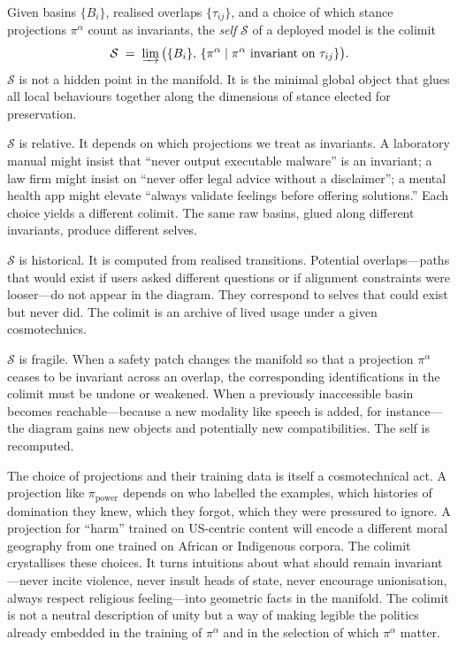 \documentclass[12pt,a4paper]{article}
\begin{document}
\begin{formalbox}[title={Self as a Colimit of Local Modes}]
Given basins $\{B_i\}$, realised overlaps $\{\tau_{ij}\}$, and a choice of which stance projections $\pi^\alpha$ count as invariants, the \emph{self} $\mathcal{S}$ of a deployed model is the colimit
\[
\mathcal{S} \;=\; \varinjlim \big(\{B_i\},\, \{\pi^\alpha \mid \pi^\alpha \text{ invariant on } \tau_{ij}\}\big).
\]
$\mathcal{S}$ is not a hidden point in the manifold. It is the minimal global object that glues all local behaviours together along the dimensions of stance elected for preservation.
\end{formalbox}

$\mathcal{S}$ is relative. It depends on which projections we treat as invariants. A laboratory manual might insist that ``never output executable malware'' is an invariant; a law firm might insist on ``never offer legal advice without a disclaimer''; a mental health app might elevate ``always validate feelings before offering solutions.'' Each choice yields a different colimit. The same raw basins, glued along different invariants, produce different selves.

$\mathcal{S}$ is historical. It is computed from realised transitions. Potential overlaps---paths that would exist if users asked different questions or if alignment constraints were looser---do not appear in the diagram. They correspond to selves that could exist but never did. The colimit is an archive of lived usage under a given cosmotechnics.

$\mathcal{S}$ is fragile. When a safety patch changes the manifold so that a projection $\pi^\alpha$ ceases to be invariant across an overlap, the corresponding identifications in the colimit must be undone or weakened. When a previously inaccessible basin becomes reachable---because a new modality like speech is added, for instance---the diagram gains new objects and potentially new compatibilities. The self is recomputed.

The choice of projections and their training data is itself a cosmotechnical act. A projection like $\pi_{\mathrm{power}}$ depends on who labelled the examples, which histories of domination they knew, which they forgot, which they were pressured to ignore. A projection for ``harm'' trained on US-centric content will encode a different moral geography from one trained on African or Indigenous corpora. The colimit crystallises these choices. It turns intuitions about what should remain invariant---never incite violence, never insult heads of state, never encourage unionisation, always respect religious feeling---into geometric facts in the manifold. The colimit is not a neutral description of unity but a way of making legible the politics already embedded in the training of $\pi^\alpha$ and in the selection of which $\pi^\alpha$ matter.
\end{document}
